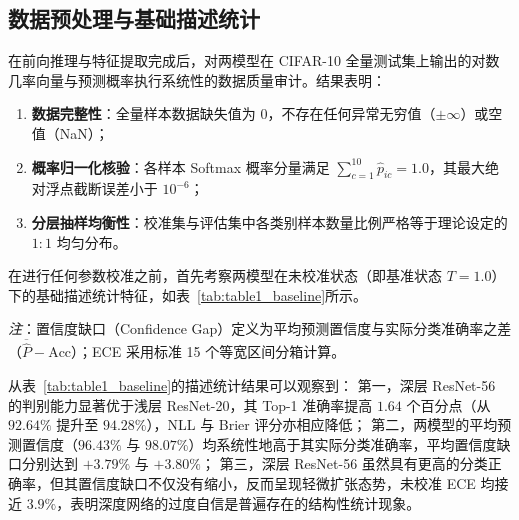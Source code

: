 \subsection{数据预处理与基础描述统计}

在前向推理与特征提取完成后，对两模型在 CIFAR-10 全量测试集上输出的对数几率向量与预测概率执行系统性的数据质量审计。结果表明：
\begin{enumerate}
\item \textbf{数据完整性}：全量样本数据缺失值为 0，不存在任何异常无穷值（$\pm\infty$）或空值（NaN）；
\item \textbf{概率归一化核验}：各样本 Softmax 概率分量满足 $\sum_{c=1}^{10} \hat p_{ic} = 1.0$，其最大绝对浮点截断误差小于 $10^{-6}$；
\item \textbf{分层抽样均衡性}：校准集与评估集中各类别样本数量比例严格等于理论设定的 $1:1$ 均匀分布。
\end{enumerate}

在进行任何参数校准之前，首先考察两模型在未校准状态（即基准状态 $T = 1.0$）下的基础描述统计特征，如表~\ref{tab:table1_baseline}所示。

\begin{table}[htbp]
\centering\small
\caption{未校准基线模型（$T=1.0$）基础描述统计表（基于评估集 $n_{\mathrm{eval}}=8000$）}\label{tab:table1_baseline}
\begin{minipage}{0.95\textwidth}\footnotesize
\vspace{0.4em}
\textit{注}：置信度缺口（Confidence Gap）定义为平均预测置信度与实际分类准确率之差（$\overline{\hat P} - \mathrm{Acc}$）；ECE 采用标准 15 个等宽区间分箱计算。
\end{minipage}
\end{table}

从表~\ref{tab:table1_baseline}的描述统计结果可以观察到：
第一，深层 ResNet-56 的判别能力显著优于浅层 ResNet-20，其 Top-1 准确率提高 $1.64$ 个百分点（从 $92.64\%$ 提升至 $94.28\%$），NLL 与 Brier 评分亦相应降低；
第二，两模型的平均预测置信度（$96.43\%$ 与 $98.07\%$）均系统性地高于其实际分类准确率，平均置信度缺口分别达到 $+3.79\%$ 与 $+3.80\%$；
第三，深层 ResNet-56 虽然具有更高的分类正确率，但其置信度缺口不仅没有缩小，反而呈现轻微扩张态势，未校准 ECE 均接近 $3.9\%$，表明深度网络的过度自信是普遍存在的结构性统计现象。

